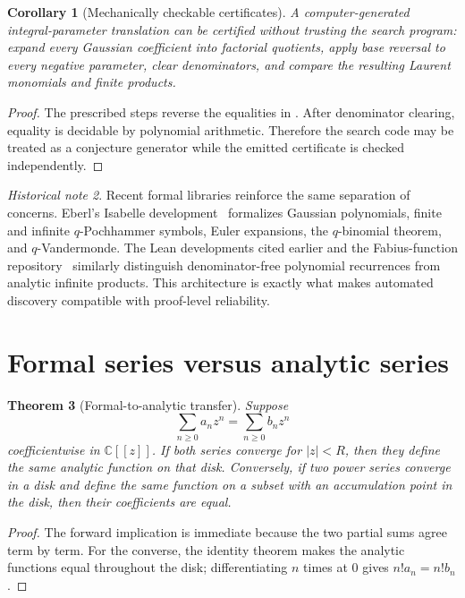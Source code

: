 \documentclass[11pt,oneside,openany]{book}
\newtheorem{theorem}{Theorem}[chapter]
\newtheorem{corollary}[theorem]{Corollary}
\theoremstyle{definition}
\theoremstyle{remark}
\newtheorem{historicalnote}[theorem]{Historical note}
\newcommand{\C}{\mathbb C}
\newcommand{\abs}[1]{\lvert #1\rvert}
\begin{document}
\begin{corollary}[Mechanically checkable certificates]\label{cor:identity-finder-certificate}
A computer-generated integral-parameter translation can be certified without trusting the search program: expand every Gaussian coefficient into factorial quotients, apply base reversal to every negative parameter, clear denominators, and compare the resulting Laurent monomials and finite products.
\end{corollary}

\begin{proof}
The prescribed steps reverse the equalities in
.  After denominator clearing, equality is decidable by polynomial arithmetic.  Therefore the search code may be treated as a conjecture generator while the emitted certificate is checked independently.
\end{proof}

\begin{historicalnote}
Recent formal libraries reinforce the same separation of concerns.  Eberl's Isabelle development~\cite{Eberl2024QAnalogues} formalizes Gaussian polynomials, finite and infinite $q$-Pochhammer symbols, Euler expansions, the $q$-binomial theorem, and $q$-Vandermonde.  The Lean developments cited earlier and the Fabius-function repository~\cite{ReshetnikovProveIt2026} similarly distinguish denominator-free polynomial recurrences from analytic infinite products.  This architecture is exactly what makes automated discovery compatible with proof-level reliability.
\end{historicalnote}


\section{Formal series versus analytic series}

\begin{theorem}[Formal-to-analytic transfer]\label{thm:formal-analytic-transfer}
Suppose
\[
 \sum_{n\ge0}a_nz^n=\sum_{n\ge0}b_nz^n
\]
coefficientwise in $\C[[z]]$.  If both series converge for $\abs z<R$, then they define the same analytic function on that disk.  Conversely, if two power series converge in a disk and define the same function on a subset with an accumulation point in the disk, then their coefficients are equal.
\end{theorem}

\begin{proof}
The forward implication is immediate because the two partial sums agree term by term.  For the converse, the identity theorem makes the analytic functions equal throughout the disk; differentiating $n$ times at $0$ gives $n!a_n=n!b_n$.
\end{proof}
\end{document}

